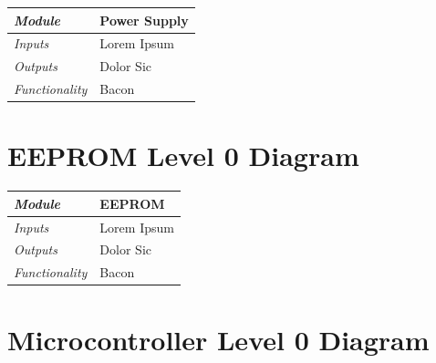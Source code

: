 \documentclass{article}
\begin{document}
\begin{tabular}{|p{1in}|p{5in}|}
\hline
\emph{Module} & Power Supply \\
\hline
\emph{Inputs}& Lorem Ipsum\\
\hline
\emph{Outputs}& Dolor Sic \\ 
\hline
\emph{Functionality}& Bacon\\
\hline
\end{tabular}

\section{EEPROM Level 0 Diagram}

\begin{tabular}{|p{1in}|p{5in}|}
\hline
\emph{Module} & EEPROM \\
\hline
\emph{Inputs}& Lorem Ipsum\\
\hline
\emph{Outputs}& Dolor Sic \\ 
\hline
\emph{Functionality}& Bacon\\
\hline
\end{tabular}

\section{Microcontroller Level 0 Diagram}
\end{document}
